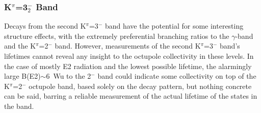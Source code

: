 \subsubsection{K$^\pi$=3$^-_2$ Band}
Decays from the second K$^\pi$=3$^-$ band have the potential for some interesting structure effects, with the extremely preferential branching ratios to the $\gamma$-band and the K$^\pi$=2$^-$ band. However, measurements of the second K$^\pi$=3$^-$ band's lifetimes cannot reveal any insight to the octupole collectivity in these levels.  In the case of mostly E2 radiation and the lowest possible lifetime, the alarmingly large B(E2)$\sim$6~Wu to the 2$^-$ band could indicate some collectivity on top of the K$^\pi$=2$^-$ octupole band, based solely on the decay pattern, but nothing concrete can be said, barring a reliable measurement of the actual lifetime of the states in the band.


